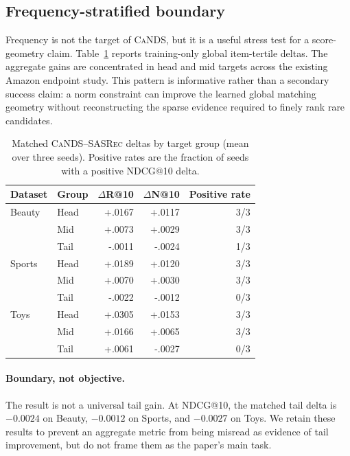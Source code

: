 \documentclass[sigconf,anonymous,review]{acmart}
\newcommand{\cands}{\textsc{CaNDS}}
\newcommand{\sasrec}{\textsc{SASRec}}
\begin{document}
\subsection{Frequency-stratified boundary}
Frequency is not the target of \cands{}, but it is a useful stress test for a score-geometry claim. Table~\ref{tab:groupdelta} reports training-only global item-tertile deltas. The aggregate gains are concentrated in head and mid targets across the existing Amazon endpoint study. This pattern is informative rather than a secondary success claim: a norm constraint can improve the learned global matching geometry without reconstructing the sparse evidence required to finely rank rare candidates.
\begin{table}[t]
\caption{Matched \cands{}--\sasrec{} deltas by target group (mean over three seeds). Positive rates are the fraction of seeds with a positive NDCG@10 delta.}\label{tab:groupdelta}
\centering\scriptsize
\begin{tabular}{llrrr}\toprule
Dataset&Group&$\Delta$R@10&$\Delta$N@10&Positive rate\\\midrule
Beauty&Head&+.0167&+.0117&3/3\\
&Mid&+.0073&+.0029&3/3\\
&Tail&-.0011&-.0024&1/3\\
Sports&Head&+.0189&+.0120&3/3\\
&Mid&+.0070&+.0030&3/3\\
&Tail&-.0022&-.0012&0/3\\
Toys&Head&+.0305&+.0153&3/3\\
&Mid&+.0166&+.0065&3/3\\
&Tail&+.0061&-.0027&0/3\\\bottomrule
\end{tabular}
\end{table}

\paragraph{Boundary, not objective.} The result is not a universal tail gain. At NDCG@10, the matched tail delta is $-0.0024$ on Beauty, $-0.0012$ on Sports, and $-0.0027$ on Toys. We retain these results to prevent an aggregate metric from being misread as evidence of tail improvement, but do not frame them as the paper's main task.
\begin{table}[t]\caption{Frequency-stratified boundary under global training-popularity item tertiles (mean $\pm$ standard deviation, three seeds).}\label{tab:tail}\centering\scriptsize
{}\end{table}
\end{document}
